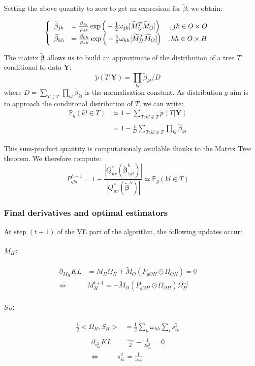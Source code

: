 \documentclass[11pt,a4paper]{article}
\newcommand{\betabf}{\boldsymbol{\beta}}
\newcommand{\Ybf}{\boldsymbol{Y}}
\begin{document}
Setting the above quantity to zero to get an expresison for $\widetilde{\beta}$, we obtain:
 
\[\left\{\begin{array}{ll r}
\widetilde{\beta}_{jk} &= \frac{\beta_{jk}}{\varphi_{jk}}\exp\Big(-\frac{1}{2} \omega_{jk}[\widetilde{M}_O^T \widetilde{M}_O]\Big) & ,jk \in O\times O\\
\widetilde{\beta}_{kh} &=\frac{\beta_{kh}}{\varphi_{kh}}\exp\Big(-\frac{1}{2} \omega_{kh}[\widetilde{M}_H^T \widetilde{M}_O]\Big) & ,kh \in O\times H
\end{array}\right.\]
 

The matrix $\widetilde{\betabf}$ allows us to build an approximate of the distribution of a tree $T$ conditional to  data $\Ybf$:
$$\tilde{p}(T|\Ybf) = \prod_{kl} \widetilde{\beta}_{kl} \big/ D $$
where $D = \sum_{T\in \mathcal{T}}\prod_{kl} \widetilde{\beta}_{kl}$ is the normalisation constant. As distribution $g$ aim is to approach the condiitonal distribution of $T$, we can write:
\begin{align*}
\mathds{P}_g(kl \in T) &\simeq 1 - \sum_{T : kl \notin T}  \tilde{p}(T|\Ybf)\\
&= 1 - \frac{1}{D} \sum_{T : kl \notin T}\prod_{kl} \widetilde{\beta}_{kl}
\end{align*}

This sum-product quantity is computationaly available thanks to the Matrix Tree theorem. We therefore compute:
$$\boxed{P_{gkl}^{h+1} = 1 - \dfrac{|Q_{uv}^*(\widetilde{\betabf}_{\setminus kl}^h)|}{|Q_{uv}^*(\widetilde{\betabf}^h)|} \simeq\mathds{P}_g(kl \in T)}$$

\subsubsection{Final derivatives and optimal estimators}

At step $(t+1)$ of the VE part of the algorithm, the following updates occur:
\paragraph{$M_H$:}
\begin{align*}
\partial_{M_H} KL &= M_H\Omega_H  + \widetilde{M}_O(P_{gOH}\odot\Omega_{OH}) =0\\
\iff& \boxed{M_H^{t+1} =- \widetilde{M}_O(P_{gOH}^t\odot\Omega_{OH})\Omega_H^{-1}}
\end{align*}


\paragraph{$S_H$:}
\begin{align*}
\frac{1}{2}<\Omega_H, S_H> &= \frac{1}{2} \sum_h \omega_{hh}\sum_i s_{ih}^2\\
\end{align*}
\begin{align*}
\partial_{s_{ih}^2} KL &=  \frac{\omega_{hh}}{2}- \frac{1}{2s_{ih}^2} = 0\\
\iff & \boxed{s_{ih}^2 = \frac{1}{\omega_{hh}}}
\end{align*}
\end{document}
